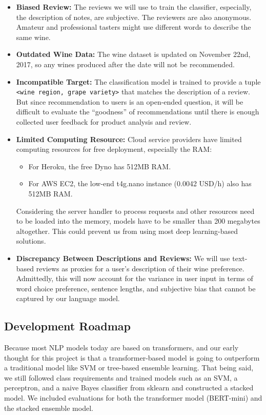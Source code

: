 \documentclass[
	a4paper,
	fontsize=10pt, %
	twoside=false, %
	secnumdepth=2, %
]{kaohandt}
\begin{document}
\begin{itemize}
	\item \textbf{Biased Review:} The reviews we will use to train the classifier, especially, the description of notes, are subjective. The reviewers are also anonymous. Amateur and professional tasters might use different words to describe the same wine.
	\item \textbf{Outdated Wine Data:} The wine dataset is updated on November 22nd, 2017, so any wines produced after the date will not be recommended.
	\item \textbf{Incompatible Target:} The classification model is trained to provide a tuple \texttt{<wine region, grape variety>} that matches the description of a review. But since recommendation to users is an open-ended question, it will be difficult to evaluate the “goodness” of recommendations until there is enough collected user feedback for product analysis and review.
	\item \textbf{Limited Computing Resource:} Cloud service providers have limited computing resources for free deployment, especially the RAM:
		\begin{itemize}
			\item For Heroku, the free Dyno has 512MB RAM.
			\item For AWS EC2, the low-end t4g.nano instance (0.0042 USD/h) also has 512MB RAM.
		\end{itemize}
		Considering the server handler to process requests and other resources need to be loaded into the memory, models have to be smaller than 200 megabytes altogether. This could prevent us from using most deep learning-based solutions.
	\item \textbf{Discrepancy Between Descriptions and Reviews:} We will use text-based reviews as proxies for a user’s description of their wine preference. Admittedly, this will now account for the variance in user input in terms of word choice preference, sentence lengths, and subjective bias that cannot be captured by our language model.
\end{itemize}

\subsection{Development Roadmap}

Because most NLP models today are based on transformers, and our early thought for this project is that a transformer-based model is going to outperform a traditional model like SVM or tree-based ensemble learning. That being said, we still followed class requirements and trained models such as an SVM, a perceptron, and a naive Bayes classifier from sklearn and constructed a stacked model. We included evaluations for both the transformer model (BERT-mini) and the stacked ensemble model.
\end{document}
